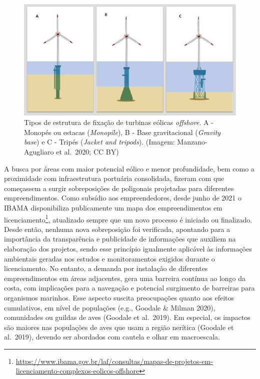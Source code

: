 \documentclass[
  oneside]{scrbook}
\DeclareRobustCommand{\href}[2]{#2\footnote{\url{#1}}}
\begin{document}
\begin{figure}[H]

{\centering \includegraphics[width=0.75\linewidth]{imagens/cap08/Figura_8.5} 

}

\caption{Tipos de estrutura de fixação de turbinas eólicas \emph{offshore}. A - Monopés ou estacas (\emph{Monopile}), B - Base gravitacional (\emph{Gravity base}) e C - Tripés (\emph{Jacket and tripods}). (Imagem: Manzano-Agugliaro et al.~2020; CC BY)}\label{fig:65}
\end{figure}



A busca por áreas com maior potencial eólico e menor profundidade, bem como a proximidade com infraestrutura portuária consolidada, fizeram com que começassem a surgir sobreposições de poligonais projetadas para diferentes empreendimentos. Como subsídio aos empreendedores, desde junho de 2021 o IBAMA disponibiliza publicamente um \href{https://www.ibama.gov.br/laf/consultas/mapas-de-projetos-em-licenciamento-complexos-eolicos-offshore}{mapa dos empreendimentos em licenciamento}, atualizado sempre que um novo processo é iniciado ou finalizado. Desde então, nenhuma nova sobreposição foi verificada, apontando para a importância da transparência e publicidade de informações que auxiliem na elaboração dos projetos, sendo esse princípio igualmente aplicável às informações ambientais geradas nos estudos e monitoramentos exigidos durante o licenciamento. No entanto, a demanda por instalação de diferentes empreendimentos em áreas adjacentes, gera uma barreira contínua ao longo da costa, com implicações para a navegação e potencial surgimento de barreiras para organismos marinhos. Esse aspecto suscita preocupações quanto aos efeitos cumulativos, em nível de populações (e.g., Goodale \& Milman 2020), comunidades ou guildas de aves (Goodale et al.~2019). Em especial, os impactos são maiores nas populações de aves que usam a região nerítica (Goodale et al.~2019), devendo ser abordados com cautela e olhar em macroescala.
\end{document}
